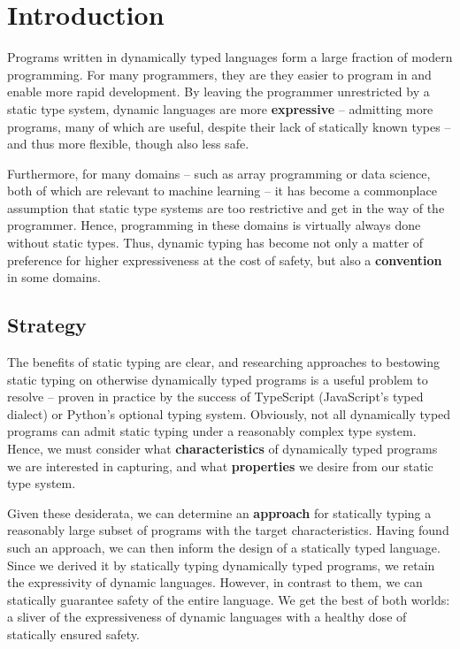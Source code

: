 \chapter{Introduction}
\label{introduction}

Programs written in dynamically typed languages form a large fraction of modern programming. 
For many programmers, they are they easier to program in and enable more rapid development.
By leaving the programmer unrestricted by a static type system, dynamic languages are more \textbf{expressive} -- admitting more programs, many of which are useful, despite their lack of statically known types -- and thus more flexible, though also less safe.

Furthermore, for many domains -- such as array programming or data science, both of which are relevant to machine learning -- it has become a commonplace assumption that static type systems are too restrictive and get in the way of the programmer. Hence, programming in these domains is virtually always done without static types.
Thus, dynamic typing has become not only a matter of preference for higher expressiveness at the cost of safety, but also a \textbf{convention} in some domains.

\section{Strategy}

The benefits of static typing are clear, and researching approaches to bestowing static typing on otherwise dynamically typed programs is a useful problem to resolve -- proven in practice by the success of TypeScript (JavaScript's typed dialect) or Python's optional typing system. 
Obviously, not all dynamically typed programs can admit static typing under a reasonably complex type system. 
Hence, we must consider what \textbf{characteristics} of dynamically typed programs we are interested in capturing, and what \textbf{properties} we desire from our static type system. 

Given these desiderata, we can determine an \textbf{approach} for statically typing a reasonably large subset of programs with the target characteristics.
Having found such an approach, we can then inform the design of a statically typed language. 
Since we derived it by statically typing dynamically typed programs, we retain the expressivity of dynamic languages. However, in contrast to them, we can statically guarantee safety of the entire language.
We get the best of both worlds: a sliver of the expressiveness of dynamic languages with a healthy dose of statically ensured safety.

